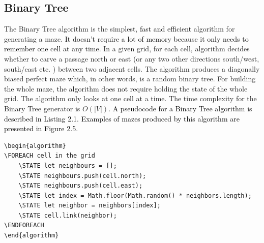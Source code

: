 \subsection{Binary Tree}
The Binary Tree algorithm \textcolor{black}{\cite{Cormen}} is the simplest, \textcolor{black}{fast and efficient} algorithm for generating a maze. \textcolor{black}{It doesn't require a lot of memory because it only needs to remember one cell at any time.} In a given grid, for each cell, algorithm decides whether to carve a passage north or east (or any two other directions south/west, south/east etc. ) between two adjacent cells. The algorithm produces a diagonally biased perfect maze which, in other words, is a random binary tree. For building the whole maze, the algorithm \textcolor{black}{does not} require holding the state of the whole grid. The algorithm only looks at one cell at a time. The time complexity for the Binary Tree generator is $O(|V|)$. \textcolor{black}{A pseudocode for a Binary Tree algorithm is described in Listing 2.1. Examples of mazes produced by this algorithm are presented in Figure 2.5}.
\newline
\begin{lstlisting}[caption={Pseudocode for a Binary Tree Algorithm}]
\begin{algorithm}
\FOREACH cell in the grid
	\STATE let neighbours = [];
	\STATE neighbours.push(cell.north);
	\STATE neighbours.push(cell.east);
	\STATE let index = Math.floor(Math.random() * neighbors.length);
	\STATE let neighbor = neighbors[index];
	\STATE cell.link(neighbor);
\ENDFOREACH	
\end{algorithm}
\end{lstlisting}
\\
\newline
